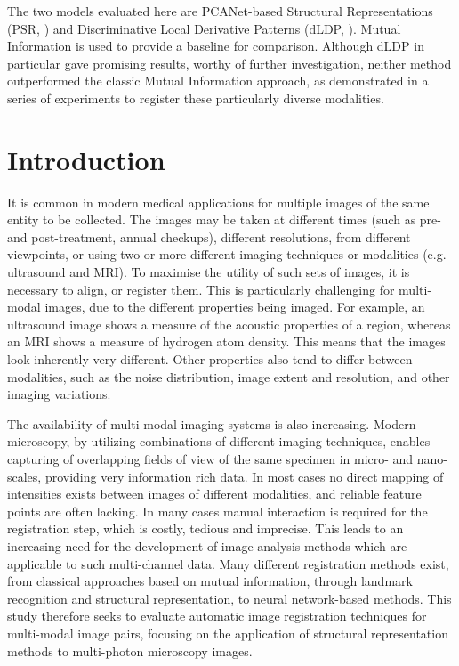 \documentclass{report}
\begin{document}
The two models evaluated here are PCANet-based Structural Representations (PSR, \cite{zhu2018pcanet}) and Discriminative Local Derivative Patterns (dLDP, \cite{jiang2017fast}). Mutual Information is used to provide a baseline for comparison. Although dLDP in particular gave promising results, worthy of further investigation, neither method outperformed the classic Mutual Information approach, as demonstrated in a series of experiments to register these particularly diverse modalities.

\tableofcontents
\chapter{Introduction}

It is common in modern medical applications for multiple images of the same entity to be collected. The images may be taken at different times (such as pre- and post-treatment, annual checkups), different resolutions, from different viewpoints, or using two or more different imaging techniques or modalities (e.g. ultrasound and MRI). To maximise the utility of such sets of images, it is necessary to align, or register them. This is particularly challenging for multi-modal images, due to the different properties being imaged. For example, an ultrasound image shows a measure of the acoustic properties of a region, whereas an MRI shows a measure of hydrogen atom density. This means that the images look inherently very different.
Other properties also tend to differ between modalities, such as the noise distribution, image extent and resolution, and other imaging variations. 

The availability of multi-modal imaging systems is also increasing. Modern microscopy, by utilizing combinations of different imaging techniques, enables capturing of overlapping fields of view of the same specimen in micro- and nano-scales, providing very information rich data. In most cases no direct mapping of intensities exists between images of different modalities, and reliable feature points are often lacking. In many cases manual interaction is required for the registration step, which is costly, tedious and imprecise. This leads to an increasing need for the development of image analysis methods which are applicable to such multi-channel data. Many different registration methods exist, from classical approaches based on mutual information, through landmark recognition and structural representation, to neural network-based methods. This study therefore seeks to evaluate automatic image registration techniques for multi-modal image pairs, focusing on the application of structural representation methods to multi-photon microscopy images.
\end{document}
